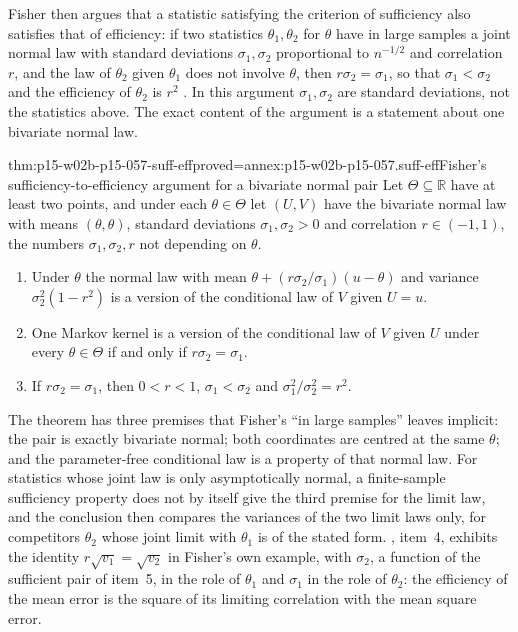 Fisher then argues that a statistic satisfying the criterion of
sufficiency also satisfies that of efficiency: if two statistics
\(\theta_1,\theta_2\) for \(\theta\) have in large samples a joint normal
law with standard deviations \(\sigma_1,\sigma_2\) proportional to
\(n^{-1/2}\) and correlation \(r\), and the law of \(\theta_2\) given
\(\theta_1\) does not involve \(\theta\), then \(r\sigma_2=\sigma_1\), so
that \(\sigma_1<\sigma_2\) and the efficiency of \(\theta_2\) is \(r^2\)
\cite[pp.~316--317]{Fisher1922Foundations}. In this argument
\(\sigma_1,\sigma_2\) are standard deviations, not the statistics above.
The exact content of the argument is a statement about one bivariate
normal law.

\begin{hbtheorem}{thm:p15-w02b-p15-057-suff-eff}{proved=annex:p15-w02b-p15-057.suff-eff}{Fisher's sufficiency-to-efficiency argument for a bivariate normal pair}
Let \(\Theta\subseteq\mathbb R\) have at least two points, and under each
\(\theta\in\Theta\) let \((U,V)\) have the bivariate normal law with means
\((\theta,\theta)\), standard deviations \(\sigma_1,\sigma_2>0\) and
correlation \(r\in(-1,1)\), the numbers \(\sigma_1,\sigma_2,r\) not
depending on \(\theta\).
\begin{enumerate}
\item Under \(\theta\) the normal law with mean
 \(\theta+(r\sigma_2/\sigma_1)(u-\theta)\) and variance
 \(\sigma_2^2(1-r^2)\) is a version of the conditional law of \(V\) given
 \(U=u\).
\item One Markov kernel is a version of the conditional law of \(V\) given
 \(U\) under every \(\theta\in\Theta\) if and only if \(r\sigma_2=\sigma_1\).
\item If \(r\sigma_2=\sigma_1\), then \(0<r<1\), \(\sigma_1<\sigma_2\) and
 \(\sigma_1^2/\sigma_2^2=r^2\).
\end{enumerate}
\end{hbtheorem}

The theorem has three premises that Fisher's ``in large samples'' leaves
implicit: the pair is exactly bivariate normal; both coordinates are
centred at the same \(\theta\); and the parameter-free conditional law is
a property of that normal law. For statistics whose joint law is only
asymptotically normal, a finite-sample sufficiency property does not by
itself give the third premise for the limit law, and the conclusion then
compares the variances of the two limit laws only, for competitors
\(\theta_2\) whose joint limit with \(\theta_1\) is of the stated form.
, item~4, exhibits the identity
\(r\sqrt{v_1}=\sqrt{v_2}\) in Fisher's own example, with \(\sigma_2\), a
function of the sufficient pair of item~5, in the role of \(\theta_1\) and
\(\sigma_1\) in the role of \(\theta_2\): the efficiency of the mean error
is the square of its limiting correlation with the mean square error.


